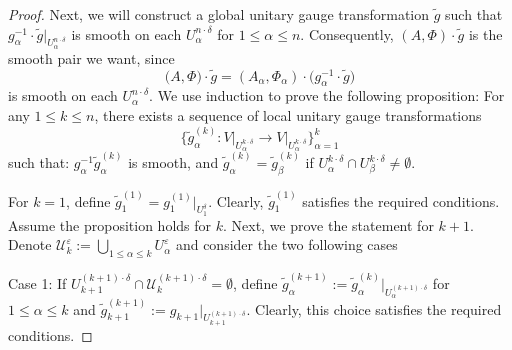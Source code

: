 \documentclass[a4paper]{amsart}
\theoremstyle{definition}
\theoremstyle{remark}
\numberwithin{equation}{section}
\begin{document}
\begin{proof}
Next, we will construct a global unitary gauge transformation $\tilde{g}$ such that $g_\alpha^{-1} \cdot \tilde{g}\big|_{U_\alpha^{n\cdot\delta}}$ is smooth on each $U_\alpha^{n\cdot\delta}$ for $1 \leq \alpha \leq n$. Consequently, $(A, \Phi) \cdot \tilde{g}$ is the smooth pair we want, since
\[
\big(A, \Phi\big) \cdot \tilde{g} = (A_\alpha, \Phi_\alpha) \cdot \big(g_\alpha^{-1} \cdot \tilde{g}\big)
\]
is smooth on each $U_\alpha^{n\cdot\delta}$. We use induction to prove the following proposition: For any $1 \leq k \leq n$, there exists a sequence of local unitary gauge transformations 
\[
\Big\{\tilde{g}_\alpha^{(k)}: V\big|_{U_\alpha^{k\cdot\delta}} \to V\big|_{U_\alpha^{k\cdot\delta}}\Big\}_{\alpha=1}^k
\]
such that: $g_\alpha^{-1} \tilde{g}_\alpha^{(k)}$ is smooth, and $\tilde{g}_\alpha^{(k)} = \tilde{g}_\beta^{(k)}$ if $U_\alpha^{k\cdot\delta} \cap U_\beta^{k\cdot\delta} \neq \emptyset$.

For $k = 1$, define $\tilde{g}_1^{(1)} = g_1^{(1)}\big|_{U_1^\delta}$. Clearly, $\tilde{g}_1^{(1)}$ satisfies the required conditions. Assume the proposition holds for $k$. Next, we prove the statement for $k+1$. Denote $\mathcal{U}_k^\varepsilon := \bigcup_{1 \leq \alpha \leq k} U_\alpha^\varepsilon$ and consider the two following cases

Case 1: If $U_{k+1}^{(k+1)\cdot\delta} \cap \mathcal{U}_k^{(k+1)\cdot\delta} = \emptyset$, define $\tilde{g}_\alpha^{(k+1)} := \tilde{g}_\alpha^{(k)}\big|_{U_\alpha^{(k+1)\cdot\delta}}$ for $1 \leq \alpha \leq k$ and $\tilde{g}_{k+1}^{(k+1)} := g_{k+1}\big|_{U_{k+1}^{(k+1)\cdot\delta}}$. Clearly, this choice satisfies the required conditions.


\end{proof}
\end{document}
